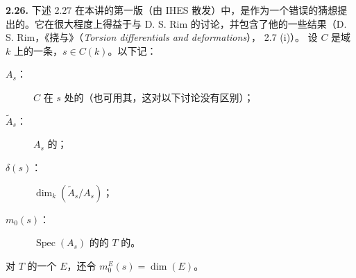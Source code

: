 \textbf{2.26.} 下述 2.27 在本讲的第一版（由 IHES 散发）中，是作为一个错误的猜想提出的。它在很大程度上得益于与 D. S. Rim 的讨论，并包含了他的一些结果（D. S. Rim，《挠与》（\textit{Torsion differentials and deformations}）， 2.7 (i)）。
设 $C$ 是域 $k$ 上的一条，$s\in C(k)$。以下记：
\begin{description}
\item[$A_s$：] $C$ 在 $s$ 处的（也可用其，这对以下讨论没有区别）；
\item[$\widetilde A_s$：] $A_s$ 的；
\item[$\delta(s)$：] $\dim_k(\widetilde A_s/A_s)$；
\item[$m_0(s)$：] $\operatorname{Spec}(A_s)$ 的的 $T$ 的。
\end{description}
对 $T$ 的一个 $E$，还令 $m_0^E(s)=\dim(E)$。

